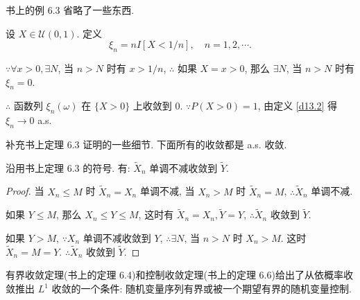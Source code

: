 \documentclass[color=black,device=normal,lang=cn]{elegantnote}
\numberwithin{equation}{section}
\theoremstyle{plain}
\numberwithin{exercise}{exsection}
\begin{document}
书上的例 6.3 省略了一些东西.
\begin{example}
    设 $X\in\mathcal{U}(0,1)$. 定义
    \[\xi_n=nI[X<1/n],\quad n=1,2,\cdots.\]

    $\because\forall x>0,\exists N$, 当 $n>N$ 时有 $x>1/n$, $\therefore$ 如果 $X=x>0$, 那么 $\exists N$, 当 $n>N$ 时有 $\xi_n=0$.
    
    $\therefore$ 函数列 $\xi_n(\omega)$ 在 $\{X>0\}$ 上收敛到 $0$. $\because P(X>0)=1$, 由定义 \ref{d13.2} 得 $\xi_n\to0$ a.s.
\end{example}

补充书上定理 6.3 证明的一些细节. 下面所有的收敛都是 a.s. 收敛.
\begin{theorem}
    沿用书上定理 6.3 的符号. 有: $\tilde{X}_n$ 单调不减收敛到 $\tilde{Y}$.
\end{theorem}
\begin{proof}
    当 $X_n\leq M$ 时 $\tilde{X}_n=X_n$ 单调不减, 当 $X_n>M$ 时 $\tilde{X}_n=M$, $\therefore\tilde{X}_n$ 单调不减.

    如果 $Y\leq M$, 那么 $X_n\leq Y\leq M$, 这时有 $\tilde{X}_n=X_n,\tilde{Y}=Y$, $\therefore\tilde{X}_n$ 收敛到 $\tilde{Y}$.
    
    如果 $Y>M$, $\because X_n$ 单调不减收敛到 $Y$, $\therefore\exists N$, 当 $n>N$ 时 $X_n>M$. 这时 $\tilde{X}_n=M=Y$. $\therefore\tilde{X}_n$ 收敛到 $\tilde{Y}$.
\end{proof}

有界收敛定理(书上的定理 6.4)和控制收敛定理(书上的定理 6.6)给出了从依概率收敛推出 $L^1$ 收敛的一个条件: 随机变量序列有界或被一个期望有界的随机变量控制.
\end{document}
